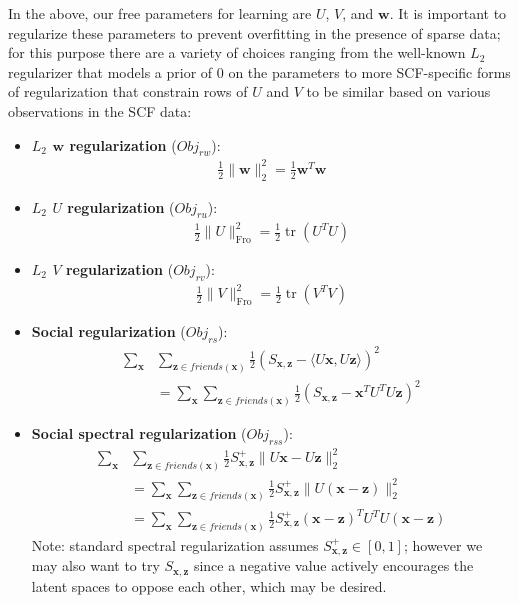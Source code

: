 \documentclass[11pt,a4paper]{article}
\newcommand{\Fro}{\mathrm{Fro}}
\newcommand{\Obj}{\mathit{Obj}}
\newcommand{\ru}{\mathit{ru}}
\newcommand{\rv}{\mathit{rv}}
\newcommand{\rw}{\mathit{rw}}
\newcommand{\rs}{\mathit{rs}}
\newcommand{\rss}{\mathit{rss}}
\newcommand{\tr}{\operatorname{tr}}
\newcommand{\x}{\vec{x}}
\newcommand{\z}{\vec{z}}
\newcommand{\w}{\vec{w}}
\newcommand{\la}{\langle}
\newcommand{\ra}{\rangle}
\renewcommand{\vec}[1]{\mathbf{#1}}
\newcommand{\subfive}{\hspace{2.5mm}}
\begin{document}
In the above, our free parameters for learning are $U$, $V$, and $\w$.
It is important to regularize these parameters to prevent overfitting in
the presence of sparse data;
for this purpose there are a variety of choices ranging from the well-known
$L_2$ regularizer that models a prior of $0$ on the parameters
to more SCF-specific forms of regularization that
constrain rows of $U$ and $V$ to be similar based on various observations
in the SCF data:
\begin{itemize}
\item {\bf $L_2$ $\w$ regularization} ($\Obj_\rw$):
\begin{align}
\frac{1}{2} \| \w \|_2^2 = \frac{1}{2} \w^T \w
\end{align}
\item {\bf $L_2$ $U$ regularization} ($\Obj_\ru$):
\begin{align}
\frac{1}{2} \| U \|_\Fro^2 = \frac{1}{2} \tr(U^T U)
\end{align}
\item {\bf $L_2$ $V$ regularization} ($\Obj_\rv$):
\begin{align}
\frac{1}{2} \| V \|_\Fro^2 = \frac{1}{2} \tr(V^T V)
\end{align}
\item {\bf Social regularization} ($\Obj_\rs$):
\begin{align}
\sum_{\x} & \sum_{\z \in \mathit{friends}(\x)} \frac{1}{2} (S_{\x,\z} - \la U\x, U\z \ra)^2 \nonumber \\
& = \sum_{\x} \sum_{\z \in \mathit{friends}(\x)} \frac{1}{2} (S_{\x,\z} - \x^T U^T U \z)^2
\end{align}
\item {\bf Social spectral regularization} ($\Obj_\rss$):
\begin{align}
\sum_{\x} & \sum_{\z \in \mathit{friends}(\x)} \frac{1}{2} S^+_{\x,\z} \| U\x - U\z \|_2^2 \nonumber \\
& = \sum_{\x} \sum_{\z \in \mathit{friends}(\x)} \frac{1}{2} S^+_{\x,\z} \| U (\x - \z) \|_2^2 \nonumber \\
& = \sum_{\x} \sum_{\z \in \mathit{friends}(\x)} \frac{1}{2} S^+_{\x,\z} (\x - \z)^T U^T U (\x - \z)
\end{align}
\subfive Note: standard spectral regularization assumes $S^+_{\x,\z} \in [0,1]$;
however we may also want to try $S_{\x,\z}$ since a negative value actively
encourages the latent spaces to oppose each other, which may be desired.
\end{itemize}
\end{document}
